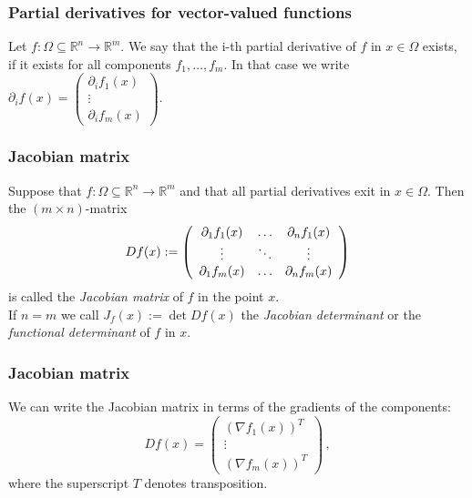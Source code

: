  \begin{frame}[fragile] \frametitle{Partial derivatives for vector-valued functions}

  Let $f\colon \Omega \subseteq \mathbb{R}^n \rightarrow \mathbb{R}^m$.
  We say that  the i-th partial derivative of $f$ in $x \in \Omega$ exists, if it
  exists for 
   all components $f_1, \ldots, f_m$. 
  In that case we write
  $\partial_i f(x) = 
  \left( \begin{array}{c}
      \partial_i f_1(x)\\
      \vdots\\
      \partial_i f_m(x)
    \end{array} \right)$.
\end{frame}

 \begin{frame}[fragile] \frametitle{Jacobian matrix}


  Suppose that $f\colon \Omega \subseteq \mathbb{R}^n \rightarrow \mathbb{R}^m$ 
 and that all partial derivatives exit in $x \in \Omega$. Then the $(m\times n)$-matrix
  \[ D f(x) := \left( \begin{array}{c c c}
      \partial_1 f_1(x) & \ldots & \partial_n f_1(x)\\
      \vdots & \ddots & \vdots\\
      \partial_1 f_m(x) & \ldots & \partial_n f_m(x)
    \end{array} \right) \]
  is called the \emph{Jacobian matrix} of $f$ in the point $x$.\\
  If  $n=m$ we call $J_f(x) := \det D f(x)$
  the \emph{Jacobian determinant} or the \emph{functional determinant} of $f$ in $x$.

\end{frame}

 \begin{frame}[fragile] \frametitle{Jacobian matrix}
We can write the Jacobian matrix in terms of the gradients of the components:
  \[ D f(x) 
  = \left( \begin{array}{c} 
      (\nabla f_1(x))^T\\
      \vdots\\ 
      (\nabla f_m(x))^T
    \end{array} \right)\,, \]
    where the superscript $T$ denotes transposition.
    
    \end{frame}

